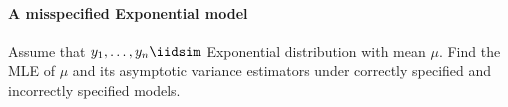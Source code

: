  


\paragraph{A misspecified Exponential model}\label{hw00math3::sandwich-exponential}
Assume that $y_1,\ldots, y_n \iidsim $ Exponential distribution with  mean $\mu  $. Find the MLE of $\mu$ and its asymptotic variance estimators under correctly specified and incorrectly specified models.

 

